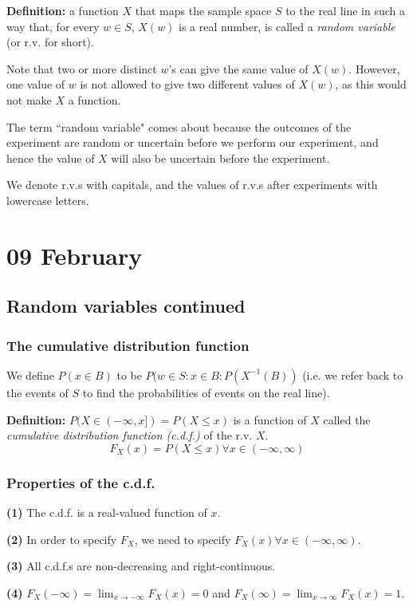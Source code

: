 \documentclass[12pt]{article}
\begin{document}
\textbf{Definition:} a function $X$ that maps the sample space $S$ to the real line in such a way that, for every $w \in S$, $X(w)$ is a real number, is called a \emph{random variable} (or r.v. for short). 

Note that two or more distinct $w$'s can give the same value of $X(w)$. However, one value of $w$ is not allowed to give two different values of $X(w)$, as this would not make $X$ a function.

The term ``random variable" comes about because the outcomes of the experiment are random or uncertain before we perform our experiment, and hence the value of $X$ will also be uncertain before the experiment.

We denote r.v.s with capitals, and the values of r.v.s after experiments with lowercase letters.

\section{09 February}
\subsection{Random variables continued}
\subsubsection{The cumulative distribution function}
We define $P(x \in B)$ to be $P(w \in S : x \in B : P(X^{-1} (B))$ (i.e. we refer back to the events of $S$ to find the probabilities of events on the real line).

\textbf{Definition:} $P(X \in (-\infty, x]) = P(X \leq x)$ is a function of $X$ called the \emph{cumulative distribution function (c.d.f.)} of the r.v. $X$. 
\[
	F_X (x) = P(X \leq x) \forall x \in (-\infty, \infty)
\]

\subsubsection{Properties of the c.d.f.}
\textbf{(1)} The c.d.f. is a real-valued function of $x$.

\textbf{(2)} In order to specify $F_X$, we need to specify $F_X (x) \forall x \in (-\infty, \infty)$.

\textbf{(3)} All c.d.f.s are non-decreasing and right-continuous.

\textbf{(4)} $F_X (-\infty) = \lim_{x \to -\infty} F_X (x) = 0$ and $F_X (\infty) = \lim_{x \to \infty} F_X (x) = 1$.
\end{document}
